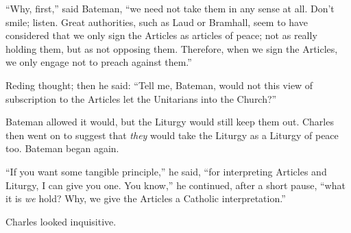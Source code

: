 ``Why, first,'' said Bateman, ``we need not take them
in any sense at all. Don't smile; listen. Great authorities, such as
Laud or Bramhall, seem to have considered that we only sign the
Articles as articles of peace; not as really holding them, but as not
opposing them. Therefore, when we sign the Articles, we only engage
not to preach against them.''

Reding thought; then he said: ``Tell me, Bateman, would not
this view of subscription to the Articles let the Unitarians into the
Church?''

Bateman allowed it would, but the Liturgy would still keep them
out. Charles then went on to suggest that \emph{they} would take
the Liturgy as a Liturgy of peace too. Bateman began again.

``If you want some tangible principle,'' he said, ``for
interpreting Articles and Liturgy, I can give you one. You know,''
he continued, after a short pause, ``what it is \emph{we} hold?
Why, we give the Articles a Catholic interpretation.''

Charles looked inquisitive.

